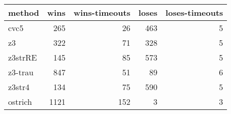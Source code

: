 \begin{tabular}{lrrrr}
\hline
 method   &   wins &   wins-timeouts &   loses &   loses-timeouts \\
\hline
 cvc5     &    265 &              26 &     463 &                5 \\
 z3       &    322 &              71 &     328 &                5 \\
 z3strRE  &    145 &              85 &     573 &                5 \\
 z3-trau  &    847 &              51 &      89 &                6 \\
 z3str4   &    134 &              75 &     590 &                5 \\
 ostrich  &   1121 &             152 &       3 &                3 \\
\hline
\end{tabular}
